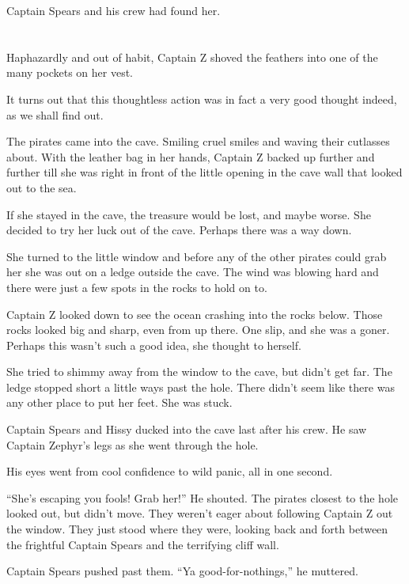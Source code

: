 \documentclass[12pt]{extbook}
\begin{document}
  Captain Spears and his crew had found her.
  
  \section{}\label{section-20}
  
  Haphazardly and out of habit, Captain Z shoved the feathers into one of
  the many pockets on her vest.
  
  It turns out that this thoughtless action was in fact a very good
  thought indeed, as we shall find out.
  
  The pirates came into the cave. Smiling cruel smiles and waving their
  cutlasses about. With the leather bag in her hands, Captain Z backed up
  further and further till she was right in front of the little opening in
  the cave wall that looked out to the sea.
  
  If she stayed in the cave, the treasure would be lost, and maybe worse.
  She decided to try her luck out of the cave. Perhaps there was a way
  down.
  
  She turned to the little window and before any of the other pirates
  could grab her she was out on a ledge outside the cave. The wind was
  blowing hard and there were just a few spots in the rocks to hold on to.
  
  Captain Z looked down to see the ocean crashing into the rocks below.
  Those rocks looked big and sharp, even from up there. One slip, and she
  was a goner. Perhaps this wasn't such a good idea, she thought to
  herself.
  
  She tried to shimmy away from the window to the cave, but didn't get
  far. The ledge stopped short a little ways past the hole. There didn't
  seem like there was any other place to put her feet. She was stuck.
  
  Captain Spears and Hissy ducked into the cave last after his crew. He
  saw Captain Zephyr's legs as she went through the hole.
  
  His eyes went from cool confidence to wild panic, all in one second.
  
  \enquote{She's escaping you fools! Grab her!} He shouted. The pirates
  closest to the hole looked out, but didn't move. They weren't eager
  about following Captain Z out the window. They just stood where they
  were, looking back and forth between the frightful Captain Spears and
  the terrifying cliff wall.
  
  Captain Spears pushed past them. \enquote{Ya good-for-nothings,} he
  muttered.
  
\end{document}

